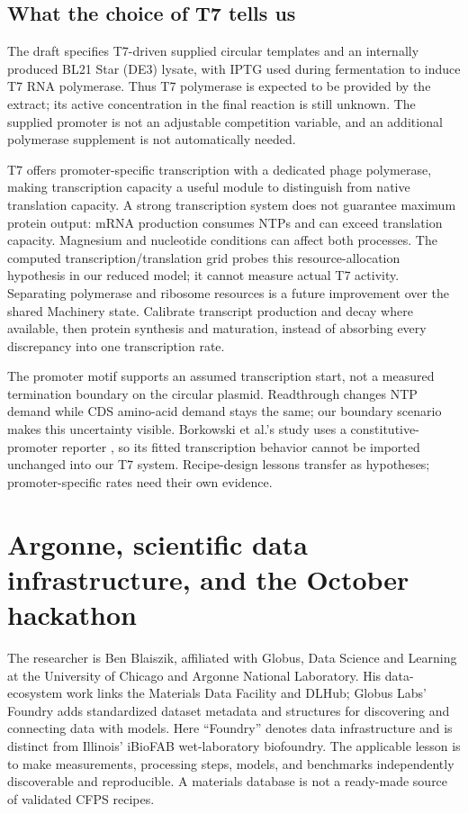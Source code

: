 \subsection{What the choice of T7 tells us}
The draft specifies T7-driven supplied circular templates and an internally
produced BL21 Star (DE3) lysate, with IPTG used during fermentation to induce T7
RNA polymerase\cite{competition_rules}. Thus T7 polymerase is expected to be
provided by the extract; its active concentration in the final reaction is still
unknown. The supplied promoter is not an adjustable competition variable, and
an additional polymerase supplement is not automatically needed.

T7 offers promoter-specific transcription with a dedicated phage polymerase,
making transcription capacity a useful module to distinguish from native
translation capacity\cite{yang}. A strong transcription system does not guarantee
maximum protein output: mRNA production consumes NTPs and can exceed translation
capacity. Magnesium and nucleotide conditions can affect both processes. The
computed transcription/translation grid probes this resource-allocation hypothesis
in our reduced model; it cannot measure actual T7 activity. Separating polymerase
and ribosome resources is a future improvement over the shared Machinery state.
Calibrate transcript production and decay where available, then protein synthesis
and maturation, instead of absorbing every discrepancy into one transcription rate.

The promoter motif supports an assumed transcription start, not a measured
termination boundary on the circular plasmid. Readthrough changes NTP demand
while CDS amino-acid demand stays the same; our boundary scenario makes this
uncertainty visible. Borkowski et al.'s study uses a constitutive-promoter reporter
\cite{borkowski}, so its fitted transcription behavior cannot be imported unchanged
into our T7 system. Recipe-design lessons transfer as hypotheses; promoter-specific
rates need their own evidence.

\section{Argonne, scientific data infrastructure, and the October hackathon}
The researcher is Ben Blaiszik, affiliated with Globus, Data Science and Learning
at the University of Chicago and Argonne National Laboratory\cite{blaiszik}.
His data-ecosystem work links the Materials Data Facility and DLHub; Globus Labs'
Foundry adds standardized dataset metadata and structures for discovering and
connecting data with models\cite{foundry}. Here ``Foundry'' denotes data
infrastructure and is distinct from Illinois' iBioFAB wet-laboratory biofoundry.
The applicable lesson is to make measurements, processing steps, models, and
benchmarks independently discoverable and reproducible. A materials database
is not a ready-made source of validated CFPS recipes.


